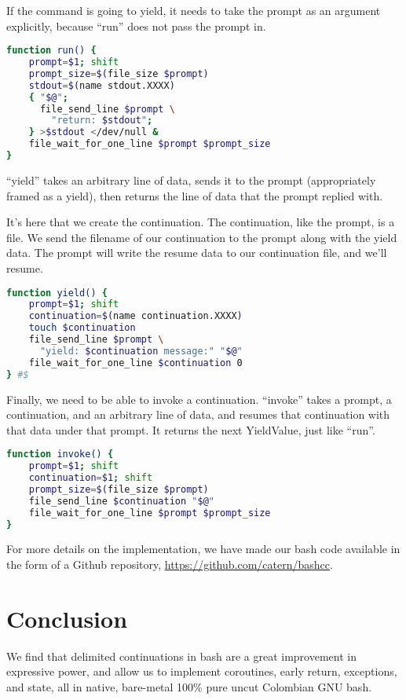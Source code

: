 \documentclass[sigplan]{acmart}
\begin{document}
If the command is going to yield, it needs to take the prompt as an argument explicitly,
because ``run'' does not pass the prompt in.

\begin{lstlisting}[language=bash]
function run() {
    prompt=$1; shift
    prompt_size=$(file_size $prompt)
    stdout=$(name stdout.XXXX)
    { "$@";
      file_send_line $prompt \
        "return: $stdout";
    } >$stdout </dev/null &
    file_wait_for_one_line $prompt $prompt_size
}
\end{lstlisting}

``yield'' takes an arbitrary line of data,
sends it to the prompt (appropriately framed as a yield),
then returns the line of data that the prompt replied with.

It's here that we create the continuation.
The continuation, like the prompt, is a file.
We send the filename of our continuation to the prompt along with the yield data.
The prompt will write the resume data to our continuation file, and we'll resume.

\begin{lstlisting}[language=bash]
function yield() {
    prompt=$1; shift
    continuation=$(name continuation.XXXX)
    touch $continuation
    file_send_line $prompt \
      "yield: $continuation message:" "$@"
    file_wait_for_one_line $continuation 0
} #$
\end{lstlisting}

Finally, we need to be able to invoke a continuation.
``invoke'' takes a prompt, a continuation, and an arbitrary line of data,
and resumes that continuation with that data under that prompt.
It returns the next YieldValue, just like ``run''.

\begin{lstlisting}[language=bash]
function invoke() {
    prompt=$1; shift
    continuation=$1; shift
    prompt_size=$(file_size $prompt)
    file_send_line $continuation "$@"
    file_wait_for_one_line $prompt $prompt_size
}
\end{lstlisting}

For more details on the implementation,
we have made our bash code available in the form of a Github repository,
\url{https://github.com/catern/bashcc}.

\section{Conclusion}\label{conclusion}
We find that delimited continuations in bash are a great improvement in expressive power,
and allow us to implement coroutines, early return, exceptions, and state,
all in native, bare-metal 100\% pure uncut Colombian GNU bash.
\end{document}
